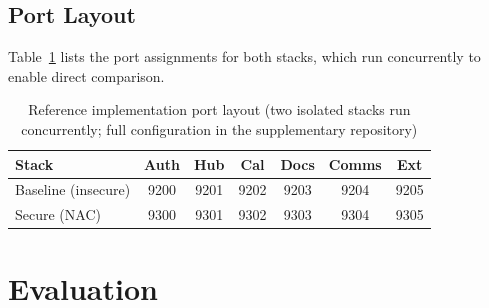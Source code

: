 \documentclass[journal]{IEEEtran}
\theoremstyle{definition}
\begin{document}
\subsection{Port Layout}

Table~\ref{tab:ports} lists the port assignments for both stacks, which run concurrently to enable direct comparison.

\begin{table}[h]
\caption{Reference implementation port layout (two isolated stacks
run concurrently; full configuration in the supplementary repository)}
\label{tab:ports}
\centering
\footnotesize
\begin{tabular}{lcccccc}
\toprule
\textbf{Stack} & \textbf{Auth} & \textbf{Hub} & \textbf{Cal}
               & \textbf{Docs} & \textbf{Comms} & \textbf{Ext} \\
\midrule
Baseline (insecure) & 9200 & 9201 & 9202 & 9203 & 9204 & 9205 \\
Secure (NAC)        & 9300 & 9301 & 9302 & 9303 & 9304 & 9305 \\
\bottomrule
\end{tabular}
\end{table}


\section{Evaluation}
\label{sec:eval}
\end{document}
